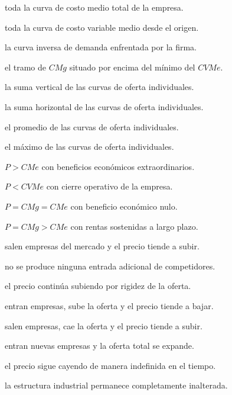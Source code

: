 \begin{opts}
    \item toda la curva de costo medio total de la empresa.
    \item toda la curva de costo variable medio desde el origen.
    \item la curva inversa de demanda enfrentada por la firma.
    \item el tramo de $CMg$ situado por encima del mínimo del $CVMe$.
\end{opts}

\begin{opts}
    \item la suma vertical de las curvas de oferta individuales.
    \item la suma horizontal de las curvas de oferta individuales.
    \item el promedio de las curvas de oferta individuales.
    \item el máximo de las curvas de oferta individuales.
\end{opts}

\begin{opts}
    \item $P>CMe$ con beneficios económicos extraordinarios.
    \item $P<CVMe$ con cierre operativo de la empresa.
    \item $P=CMg=CMe$ con beneficio económico nulo.
    \item $P=CMg>CMe$ con rentas sostenidas a largo plazo.
\end{opts}

\begin{opts}
    \item salen empresas del mercado y el precio tiende a subir.
    \item no se produce ninguna entrada adicional de competidores.
    \item el precio continúa subiendo por rigidez de la oferta.
    \item entran empresas, sube la oferta y el precio tiende a bajar.
\end{opts}

\begin{opts}
    \item salen empresas, cae la oferta y el precio tiende a subir.
    \item entran nuevas empresas y la oferta total se expande.
    \item el precio sigue cayendo de manera indefinida en el tiempo.
    \item la estructura industrial permanece completamente inalterada.
\end{opts}

